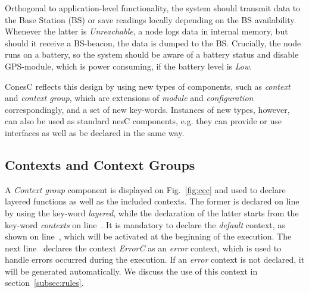 Orthogonal to application-level functionality, the system should transmit data to
the Base Station (BS) or save readings locally depending on the BS availability.
Whenever the latter is \emph{Unreachable}, a node logs data in internal memory,
but should it receive a BS-beacon, the data is dumped to the BS. Crucially, the
node runs on a battery, so the system
should be aware of a battery status and disable GPS-module, which is power
consuming, if the battery level is \emph{Low}.

ConesC reflects this design by using new types of components, such as
\emph{context} and \emph{context group}, which are extensions of \emph{module} and
\emph{configuration} correspondingly, and a set of new key-words.
Instances of new types, however, can also be used as standard nesC components,
e.g. they can provide or use interfaces as well as be declared in the same way.


\subsection{Contexts and Context Groups}\label{subsec:components}

A \emph{Context group} component is displayed on Fig.~\ref{fig:ccc} and used to declare layered
functions as well as the included contexts. The former is declared on line~
by using the key-word \emph{layered}, while the declaration of the latter starts from the
key-word \emph{contexts} on line~. It is mandatory to declare
the \emph{default} context, as shown on line~, which will be
activated at the beginning of the execution. The next line~ declares the
context \emph{ErrorC} as an \emph{error} context, which is used to handle errors occurred
during the execution. If an \emph{error} context is not declared, it will be generated automatically.
We discuss the use of this context in section~\ref{subsec:rules}.

